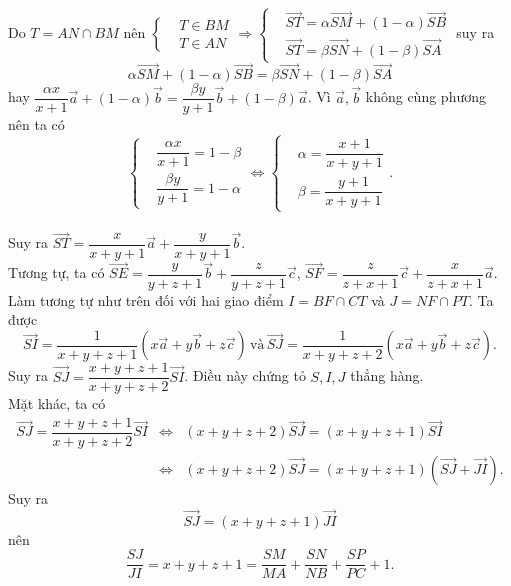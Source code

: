 \begin{bt}
{\begin{itemize}
{\begin{tikzpicture}[scale=1, line join=round, line cap=round]
			\end{tikzpicture}}
		Do $T=AN\cap BM$ nên $\left\{\begin{aligned}
		&T\in BM \\
		&T\in AN
		\end{aligned}\right. \Rightarrow \left\{\begin{aligned}
		&\overrightarrow{ST}=\alpha \overrightarrow{SM}+\left(1-\alpha \right)\overrightarrow{SB} \\
		&\overrightarrow{ST}=\beta \overrightarrow{SN}+\left(1-\beta \right)\overrightarrow{SA}
		\end{aligned}\right. $  
		suy ra $$\alpha \overrightarrow{SM}+\left(1-\alpha \right)\overrightarrow{SB}=\beta \overrightarrow{SN}+\left(1-\beta \right)\overrightarrow{SA}$$  
		hay $\dfrac{\alpha x}{x+1}\overrightarrow{a}+\left(1-\alpha \right)\overrightarrow{b}=\dfrac{\beta y}{y+1}\overrightarrow{b}+\left(1-\beta \right)\overrightarrow{a}$.
				Vì $\overrightarrow{a},\overrightarrow{b}$ không cùng phương nên ta có  
				$$\left\{\begin{aligned}
				&\dfrac{\alpha x}{x+1}=1-\beta \\
				&\dfrac{\beta y}{y+1}=1-\alpha
				\end{aligned}\right. \Leftrightarrow \left\{\begin{aligned}
				&\alpha =\dfrac{x+1}{x+y+1} \\
				&\beta =\dfrac{y+1}{x+y+1}
				\end{aligned}\right. .$$ \\
				Suy ra $\overrightarrow{ST}=\dfrac{x}{x+y+1}\overrightarrow{a}+\dfrac{y}{x+y+1}\overrightarrow{b}$. \\
				Tương tự, ta có $\overrightarrow{SE}=\dfrac{y}{y+z+1}\overrightarrow{b}+\dfrac{z}{y+z+1}\overrightarrow{c}$, $\overrightarrow{SF}=\dfrac{z}{z+x+1}\overrightarrow{c}+\dfrac{x}{z+x+1}\overrightarrow{a}$. \\
				Làm tương tự như trên đối với hai giao điểm $I=BF\cap CT$ và $J=NF\cap PT$. Ta được  
				$$\overrightarrow{SI}=\dfrac{1}{x+y+z+1}\left(x\overrightarrow{a}+y\overrightarrow{b}+z\overrightarrow{c}\right)\, \text{và}\,\overrightarrow{SJ}=\dfrac{1}{x+y+z+2}\left(x\overrightarrow{a}+y\overrightarrow{b}+z\overrightarrow{c}\right).$$
				Suy ra $\overrightarrow{SJ}=\dfrac{x+y+z+1}{x+y+z+2}\overrightarrow{SI}$. Điều này chứng tỏ $S,I,J$ thẳng hàng. \\
				Mặt khác, ta có \begin{eqnarray*}
					\overrightarrow{SJ}=\dfrac{x+y+z+1}{x+y+z+2}\overrightarrow{SI} &\Leftrightarrow& (x+y+z+2)\overrightarrow{SJ}=(x+y+z+1)\overrightarrow{SI} \\&\Leftrightarrow& (x+y+z+2)\overrightarrow{SJ}=(x+y+z+1)\left(\overrightarrow{SJ}+\overrightarrow{JI}\right).
				\end{eqnarray*}
				Suy ra $$\overrightarrow{SJ}=(x+y+z+1)\overrightarrow{JI}$$ nên $$\dfrac{SJ}{JI}=x+y+z+1=\dfrac{SM}{MA}+\dfrac{SN}{NB}+\dfrac{SP}{PC}+1.$$ 
		\end{itemize}
		
}\end{bt}


